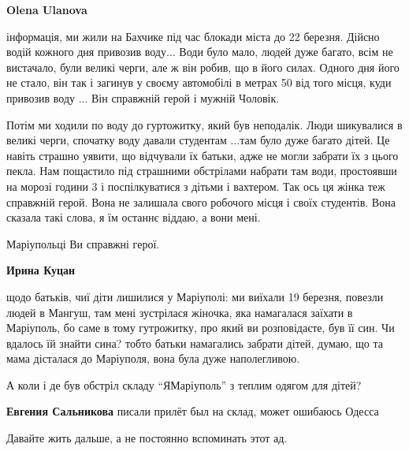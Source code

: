 \begin{itemize} %
\textbf{Olena Ulanova} 💯 

інформація, ми жили на Бахчике під час блокади міста до 22 березня. Дійсно
водій кожного дня привозив воду... Води було мало, людей дуже багато, всім не
вистачало, були великі черги, але ж він робив, що в його силах. Одного дня його
не стало, він так і загинув у своєму автомобілі в метрах 50 від того місця,
куди привозив воду ... Він справжній герой і мужній Чоловік.

Потім ми ходили по воду до гуртожитку, який був неподалік. Люди шикувалися в
великі черги, спочатку воду давали студентам ...там було дуже багато дітей. Це
навіть страшно уявити, що відчували їх батьки, адже не могли забрати їх з цього
пекла. Нам пощастило під страшними обстрілами набрати там води, простоявши на
морозі години 3 і поспілкуватися з дітьми і вахтером. Так ось ця жінка теж
справжній герой. Вона не залишала свого робочого місця і своїх студентів. Вона
сказала такі слова, я їм останнє віддаю, а вони мені.

Маріупольці Ви справжні герої.

\textbf{Ирина Куцан} 

щодо батьків, чиї діти лишилися у Маріуполі: ми виїхали 19 березня, повезли людей
в Мангуш, там мені зустрілася жіночка, яка намагалася заїхати в Маріуполь, бо саме
в тому гутрожитку, про який ви розповідаєте, був її син. Чи вдалось їй знайти
сина? тобто батьки намагались забрати дітей, думаю, що та мама дісталася до
Маріуполя, вона була дуже наполегливою.

\end{itemize} %


А коли і де був обстріл складу
\enquote{ЯМаріуполь} з теплим одягом для дітей?

\begin{itemize} %
\textbf{Евгения Сальникова} писали прилёт был на склад, может ошибаюсь Одесса
\end{itemize} %


Давайте жить дальше, а не постоянно вспоминать этот ад.

